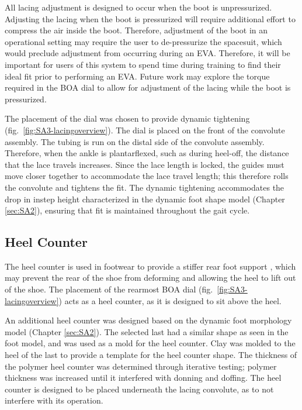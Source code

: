 \documentclass[defaultstyle,11pt]{thesis}
\begin{document}
All lacing adjustment is designed to occur when the boot is unpressurized.
Adjusting the lacing when the boot is pressurized will require additional effort to compress the air inside the boot.
Therefore, adjustment of the boot in an operational setting may require the user to de-pressurize the spacesuit, which would preclude adjustment from occurring during an EVA.
Therefore, it will be important for users of this system to spend time during training to find their ideal fit prior to performing an EVA.
Future work may explore the torque required in the BOA dial to allow for adjustment of the lacing while the boot is pressurized.

The placement of the dial was chosen to provide dynamic tightening (fig.~\ref{fig:SA3-lacingoverview}).
The dial is placed on the front of the convolute assembly.
The tubing is run on the distal side of the convolute assembly.
Therefore, when the ankle is plantarflexed, such as during heel-off, the distance that the lace travels increases.
Since the lace length is locked, the guides must move closer together to accommodate the lace travel length; this therefore rolls the convolute and tightens the fit.
The dynamic tightening accommodates the drop in instep height characterized in the dynamic foot shape model (Chapter \ref{sec:SA2}), ensuring that fit is maintained throughout the gait cycle.

\hypertarget{heel-counter}{%
\subsection{Heel Counter}\label{heel-counter}}

The heel counter is used in footwear to provide a stiffer rear foot support \citep{Van1995}, which may prevent the rear of the shoe from deforming and allowing the heel to lift out of the shoe.
The placement of the rearmost BOA dial (fig.~\ref{fig:SA3-lacingoverview}) acts as a heel counter, as it is designed to sit above the heel.

An additional heel counter was designed based on the dynamic foot morphology model (Chapter \ref{sec:SA2}).
The selected last had a similar shape as seen in the foot model, and was used as a mold for the heel counter.
Clay was molded to the heel of the last to provide a template for the heel counter shape.
The thickness of the polymer heel counter was determined through iterative testing; polymer thickness was increased until it interfered with donning and doffing.
The heel counter is designed to be placed underneath the lacing convolute, as to not interfere with its operation.
\end{document}

